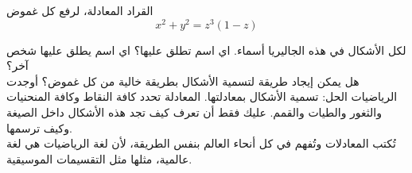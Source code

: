 \begin{surferPage}[القراد]{القراد}
المعادلة، لرفع كل غموض \\
\smallskip
\[x^2 + y^2	= z^3	(1 - z) \]


\singlespacing
لكل الأشكال في هذه الجاليريا أسماء. اي اسم تطلق عليها؟ اي اسم يطلق عليها شخص آخر؟\\
\vspace{0.3cm}
هل يمكن إيجاد طريقة لتسمية الأشكال بطريقة خالية من كل غموض؟ أوجدت الرياضيات الحل: تسمية الأشكال بمعادلتها. المعادلة تحدد كافة النقاط وكافة المنحنيات والثغور والطيات والقمم. عليك فقط أن تعرف كيف تجد هذه الأشكال داخل الصيغة وكيف ترسمها.\\
\vspace{0.3cm}
تُكتب المعادلات وتُفهم في كل أنحاء العالم بنفس الطريقة، لأن لغة الرياضيات هي لغة عالمية، مثلها مثل التقسيمات الموسيقية.
\end{surferPage}
